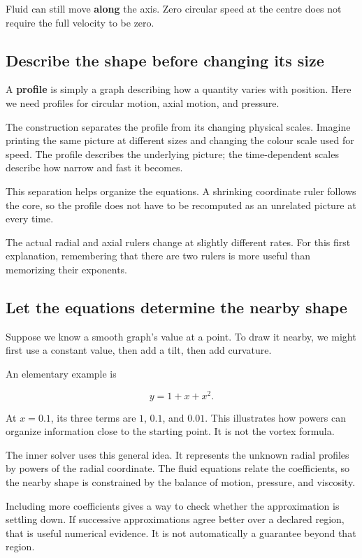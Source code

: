 \documentclass[
  english,
  11pt,
]{article}
\begin{document}
Fluid can still move \textbf{along} the axis. Zero circular speed at the
centre does not require the full velocity to be zero.

\subsection{Describe the shape before changing its
size}\label{describe-the-shape-before-changing-its-size}

A \textbf{profile} is simply a graph describing how a quantity varies
with position. Here we need profiles for circular motion, axial motion,
and pressure.

The construction separates the profile from its changing physical
scales. Imagine printing the same picture at different sizes and
changing the colour scale used for speed. The profile describes the
underlying picture; the time-dependent scales describe how narrow and
fast it becomes.

This separation helps organize the equations. A shrinking coordinate
ruler follows the core, so the profile does not have to be recomputed as
an unrelated picture at every time.

The actual radial and axial rulers change at slightly different rates.
For this first explanation, remembering that there are two rulers is
more useful than memorizing their exponents.

\subsection{Let the equations determine the nearby
shape}\label{let-the-equations-determine-the-nearby-shape}

Suppose we know a smooth graph's value at a point. To draw it nearby, we
might first use a constant value, then add a tilt, then add curvature.

An elementary example is

\[
y=1+x+x^2.
\]

At \(x=0.1\), its three terms are \(1\), \(0.1\), and \(0.01\). This
illustrates how powers can organize information close to the starting
point. It is not the vortex formula.

The inner solver uses this general idea. It represents the unknown
radial profiles by powers of the radial coordinate. The fluid equations
relate the coefficients, so the nearby shape is constrained by the
balance of motion, pressure, and viscosity.

Including more coefficients gives a way to check whether the
approximation is settling down. If successive approximations agree
better over a declared region, that is useful numerical evidence. It is
not automatically a guarantee beyond that region.
\end{document}
